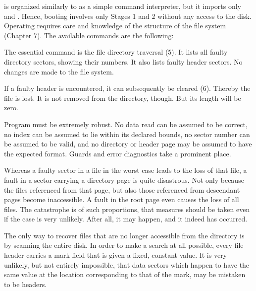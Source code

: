  is organized similarly to  as a simple command interpreter, but it imports only  and . Hence, booting involves only Stages 1 and 2 without any access to the disk. Operating  requires care and knowledge of the structure of the file system (Chapter 7). The available commands are the following:


The essential command is the file directory traversal (5). It lists all faulty directory sectors, showing their numbers. It also lists faulty header sectors. No changes are made to the file system.

If a faulty header is encountered, it can subsequently be cleared (6). Thereby the file is lost. It is not removed from the directory, though. But its length will be zero.

Program  must be extremely robust. No data read can be assumed to be correct, no index can be assumed to lie within its declared bounds, no sector number can be assumed to be valid, and no directory or header page may be assumed to have the expected format. Guards and error diagnostics take a prominent place.

Whereas a faulty sector in a file in the worst case leads to the loss of that file, a fault in a sector carrying a directory page is quite disastrous. Not only because the files referenced from that page, but also those referenced from descendant pages become inaccessible. A fault in the root page even causes the loss of all files. The catastrophe is of such proportions, that measures should be taken even if the case is very unlikely. After all, it may happen, and it indeed has occurred.

The only way to recover files that are no longer accessible from the directory is by scanning the entire disk. In order to make a search at all possible, every file header carries a mark field that is given a fixed, constant value. It is very unlikely, but not entirely impossible, that data sectors which happen to have the same value at the location corresponding to that of the mark, may be mistaken to be headers.

